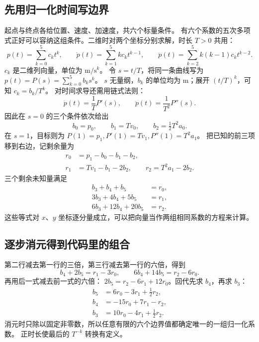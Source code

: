 \subsection{先用归一化时间写边界}
起点与终点各给位置、速度、加速度，共六个标量条件。
有六个系数的五次多项式正好可以容纳这组条件。二维时对两个坐标分别求解，时长 $T>0$ 共用：
\begin{equation}
p(t)=\sum_{k=0}^{5}c_k t^k,\qquad
\dot p(t)=\sum_{k=1}^{5}kc_k t^{k-1},\qquad
\ddot p(t)=\sum_{k=2}^{5}k(k-1)c_k t^{k-2}.
\end{equation}
$c_k$ 是二维列向量，单位为 $\mathrm{m}/\mathrm{s}^k$。
令 $s=t/T$，将同一条曲线写为 $p(t)=P(s)=\sum_{k=0}^5 b_k s^k$。
$s$ 无量纲，$b_k$ 的单位均为 m；展开 $(t/T)^k$，可知 $c_k=b_k/T^k$。
对时间求导还需用链式法则：
\begin{equation}
\dot p(t)=\frac1T P'(s),\qquad
\ddot p(t)=\frac1{T^2}P''(s).
\end{equation}
因此在 $s=0$ 的三个条件依次给出
\begin{equation}b_0=p_0,\qquad b_1=Tv_0,\qquad b_2=\tfrac12T^2a_0.\end{equation}
在 $s=1$，目标则为 $P(1)=p_1,P'(1)=Tv_1,P''(1)=T^2a_1$。
把已知的前三项移到右边，记剩余量为
\begin{align}
r_0&=p_1-b_0-b_1-b_2,\\
r_1&=Tv_1-b_1-2b_2,\qquad r_2=T^2a_1-2b_2.
\end{align}
三个剩余未知量满足
\begin{equation}
\begin{aligned}
b_3+b_4+b_5&=r_0,\\
3b_3+4b_4+5b_5&=r_1,\\
6b_3+12b_4+20b_5&=r_2.
\end{aligned}
\end{equation}
这些等式对 $x$、$y$ 坐标逐分量成立，可以把向量当作两组相同系数的方程来计算。

\subsection{逐步消元得到代码里的组合}
第二行减去第一行的三倍，第三行减去第一行的六倍，得到
\begin{equation}
b_4+2b_5=r_1-3r_0,\qquad
6b_4+14b_5=r_2-6r_0.
\end{equation}
再用后一式减去前一式的六倍：
$2b_5=r_2-6r_1+12r_0$。回代先求 $b_4$，再求 $b_3$：
\begin{equation}
\begin{aligned}
b_5&=6r_0-3r_1+\tfrac12r_2,\\
b_4&=-15r_0+7r_1-r_2,\\
b_3&=10r_0-4r_1+\tfrac12r_2.
\end{aligned}
\end{equation}
消元时只除以固定非零数，所以任意有限的六个边界值都确定唯一的一组归一化系数。
正时长使最后的 $T^{-k}$ 转换有定义。

